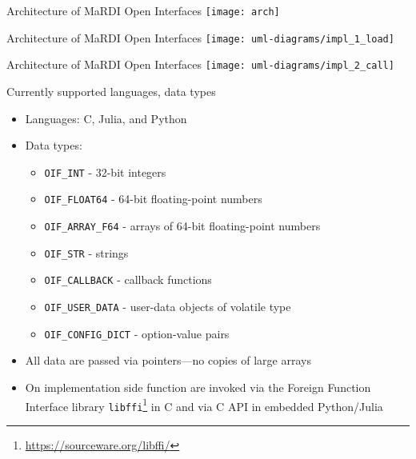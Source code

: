 \documentclass[10pt, aspectratio=169, progressbar=frametitle]{beamer}
\begin{document}
\begin{frame}{Architecture of MaRDI Open Interfaces}
  \centering
  \texttt{[image: arch]}
\end{frame}

\begin{frame}{Architecture of MaRDI Open Interfaces}
  \centering
  \texttt{[image: uml-diagrams/impl\_1\_load]}
\end{frame}

\begin{frame}{Architecture of MaRDI Open Interfaces}
  \centering
  \texttt{[image: uml-diagrams/impl\_2\_call]}
\end{frame}

\begin{frame}{Currently supported languages, data types}
  \begin{itemize}
    \item Languages: C, Julia, and Python
    \item Data types:
          \begin{itemize}
            \item \texttt{OIF\_INT} - 32-bit integers
            \item \texttt{OIF\_FLOAT64} - 64-bit floating-point numbers
            \item \texttt{OIF\_ARRAY\_F64} - arrays of 64-bit floating-point numbers
            \item \texttt{OIF\_STR} - strings
            \item \texttt{OIF\_CALLBACK} - callback functions
            \item \texttt{OIF\_USER\_DATA} - user-data objects of volatile type
            \item \texttt{OIF\_CONFIG\_DICT} - option-value pairs
          \end{itemize}
    \item All data are passed via pointers---no copies of large arrays
    \item On implementation side function are invoked via
          the Foreign Function Interface library \texttt{libffi}\footnote{\url{https://sourceware.org/libffi/}}
          in C and via C API in embedded Python/Julia
  \end{itemize}

\end{frame}
\end{document}
